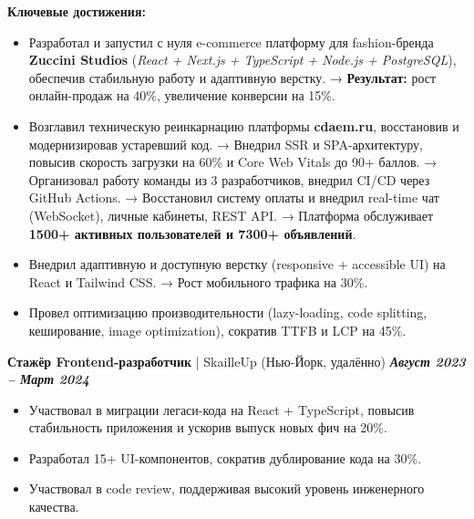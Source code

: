 \documentclass[a4paper,11pt]{article}
\newcommand{\entry}[3]{%
  \noindent\textbf{#1} | #2 \hfill \textbf{\textit{#3}} \par
}
\begin{document}
\textbf{Ключевые достижения:}
\begin{itemize}[leftmargin=*, topsep=0.5ex, itemsep=0.2ex]
    \item Разработал и запустил с нуля e-commerce платформу для fashion-бренда \textbf{Zuccini Studios} (\textit{React + Next.js + TypeScript + Node.js + PostgreSQL}), обеспечив стабильную работу и адаптивную верстку.  
    → \textbf{Результат:} рост онлайн-продаж на 40\%, увеличение конверсии на 15\%.
    \item Возглавил техническую реинкарнацию платформы \textbf{cdaem.ru}, восстановив и модернизировав устаревший код.  
    → Внедрил SSR и SPA-архитектуру, повысив скорость загрузки на 60\% и Core Web Vitals до 90+ баллов.  
    → Организовал работу команды из 3 разработчиков, внедрил CI/CD через GitHub Actions.  
    → Восстановил систему оплаты и внедрил real-time чат (WebSocket), личные кабинеты, REST API.  
    → Платформа обслуживает \textbf{1500+ активных пользователей и 7300+ объявлений}.
    \item Внедрил адаптивную и доступную верстку (responsive + accessible UI) на React и Tailwind CSS.  
    → Рост мобильного трафика на 30\%.
    \item Провел оптимизацию производительности (lazy-loading, code splitting, кеширование, image optimization), сократив TTFB и LCP на 45\%.
\end{itemize}
\vspace{1ex}

\entry{Стажёр Frontend-разработчик}{SkailleUp (Нью-Йорк, удалённо)}{Август 2023 – Март 2024}
\begin{itemize}[leftmargin=*, topsep=0.5ex, itemsep=0.2ex]
    \item Участвовал в миграции легаси-кода на React + TypeScript, повысив стабильность приложения и ускорив выпуск новых фич на 20\%.
    \item Разработал 15+ UI-компонентов, сократив дублирование кода на 30\%.
    \item Участвовал в code review, поддерживая высокий уровень инженерного качества.
\end{itemize}
\vspace{1ex}


\end{document}
